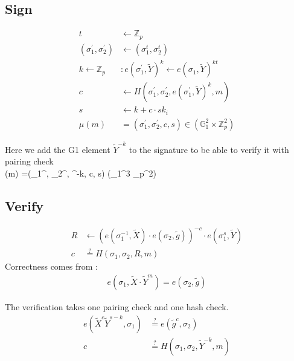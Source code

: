 \documentclass[11pt]{article}
\newenvironment{optimization}{\par\color{blue}}{\par}
\begin{document}
    \subsection{Sign}
    \begin{align}
        t &\leftarrow \mathbb{Z}_p\\
        (\sigma_1^{\prime}, \sigma_2^{\prime})
        &\leftarrow (\sigma_1^t, \sigma_2^t)\\
        k \leftarrow \mathbb{Z}_p &: e(\sigma_1^{\prime}, \tilde{Y})^k \leftarrow e(\sigma_1, \tilde{Y})^{kt} \\
        c &\leftarrow H(\sigma_1^{\prime}, \sigma_2^{\prime}, e(\sigma_1^{\prime}, \tilde{Y})^{k}, m)\\
        s &\leftarrow k+ c \cdot sk_i \\
        \mu(m) &=(\sigma_1^{\prime}, \sigma_2^{\prime}, c, s) \in (\mathbb{G}_1^2 \times \mathbb{Z}_p^2)
    \end{align}
    \begin{optimization}
        Here we add the G1 element $\tilde{Y}^{-k}$ to the signature to be able to verify it with pairing check\\
        \mu(m) =(\sigma_1^{\prime}, \sigma_2^{\prime}, ^{-k}, c, s) \in (_1^3 \times {}_p^2)
    \end{optimization}

    \subsection{Verify}
    \begin{align}
        R &\leftarrow (e(\sigma_1^{-1}, \tilde{X})\cdot e(\sigma_2, \tilde{g}))^{-c}\cdot e(\sigma_1^s, \tilde{Y}) \label{eq:R}\\
        c & \stackrel{?}{=} H(\sigma_1, \sigma_2,R, m)
    \end{align}
    Correctness comes from :
    \begin{align}
        e(\sigma_1, \tilde{X}\cdot \tilde{Y}^m)=e(\sigma_2, \tilde{g})
    \end{align}

    \begin{optimization}
        The verification takes one pairing check and one hash check.
        \begin{align}
            e(\tilde{X}^c\tilde{Y}^{s-k}, \sigma_1)&\stackrel{?}{=}  e(\tilde{g}^c, \sigma_2)\\
            c & \stackrel{?}{=} H(\sigma_1, \sigma_2,  \tilde{Y}^{-k}, m)
        \end{align}
    \end{optimization}
\end{document}
